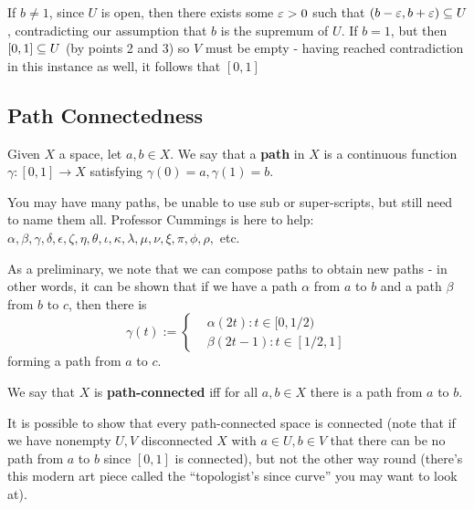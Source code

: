 \begin{boxexample}
    If $b\neq 1$, since $U$ is open, then there exists some $\varepsilon>0$ such that $(b-\varepsilon, b+\varepsilon)\subseteq U$, contradicting our assumption that $b$ is the supremum of $U$. If $b=1$, but then $[0,1]\subseteq U$ (by points 2 and 3) so $V$ must be empty - having reached contradiction in this instance as well, it follows that $[0,1]$
\end{boxexample}


\subsection{Path Connectedness}

\begin{boxdefinition}[Path]
    Given $X$ a space, let $a,b\in X$. We say that a \textbf{path} in $X$ is a continuous function $\gamma:[0,1]\to X$ satisfying $\gamma(0)=a, \gamma(1)=b$.
\end{boxdefinition}

\begin{remark}
    You may have many paths, be unable to use sub or super-scripts, but still need to name them all. Professor Cummings is here to help: $\alpha, \beta, \gamma, \delta, \epsilon,\zeta, \eta, \theta, \iota, \kappa, \lambda, \mu, \nu, \xi, \pi, \phi, \rho,$ etc.
\end{remark}

As a preliminary, we note that we can compose paths to obtain new paths - in other words, it can be shown that if we have a path $\alpha$ from $a$ to $b$ and a path $\beta$ from $b$ to $c$, then there is $$\gamma(t):=\begin{cases}
    &\alpha(2t):t\in [0,1/2)\\
    &\beta(2t-1):t\in [1/2, 1]
\end{cases}$$
forming a path from $a$ to $c$.

\begin{boxdefinition}
    We say that $X$ is \textbf{path-connected} iff for all $a,b\in X$ there is a path from $a$ to $b$.
\end{boxdefinition}


It is possible to show that every path-connected space is connected (note that if we have nonempty $U,V$ disconnected $X$ with $a\in U, b\in V$ that there can be no path from $a$ to $b$ since $[0,1]$ is connected), but not the other way round (there's this modern art piece called the ``topologist's since curve'' you may want to look at).